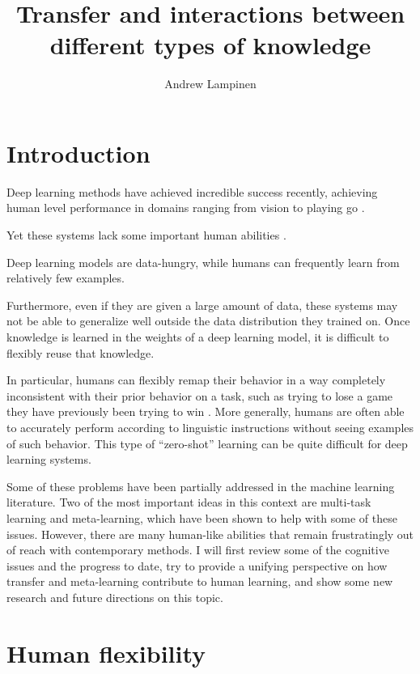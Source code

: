 \documentclass[10pt]{article}
\begin{document}
 
\title{Transfer and interactions between different types of knowledge}
\author{Andrew Lampinen}
\date{}
\maketitle
\section{Introduction}
Deep learning methods have achieved incredible success recently, achieving human level performance in domains ranging from vision \citep{???} to playing go \citep{???}. 

Yet these systems lack some important human abilities \citep[e.g.]{Lake2016}. 

Deep learning models are data-hungry, while humans can frequently learn from relatively few examples. 

Furthermore, even if they are given a large amount of data, these systems may not be able to generalize well outside the data distribution they trained on. Once knowledge is learned in the weights of a deep learning model, it is difficult to flexibly reuse that knowledge.

In particular, humans can flexibly remap their behavior in a way completely inconsistent with their prior behavior on a task, such as trying to lose a game they have previously been trying to win \citep{Lake2016}. More generally, humans are often able to accurately perform according to linguistic instructions without seeing examples of such behavior. This type of ``zero-shot'' learning can be quite difficult for deep learning systems. \par 

Some of these problems have been partially addressed in the machine learning literature. Two of the most important ideas in this context are multi-task learning and meta-learning, which have been shown to help with some of these issues. However, there are many human-like abilities that remain frustratingly out of reach with contemporary methods. I will first review some of the cognitive issues and the progress to date, try to provide a unifying perspective on how transfer and meta-learning contribute to human learning, and show some new research and future directions on this topic. \par

\section{Human flexibility}
\end{document}

